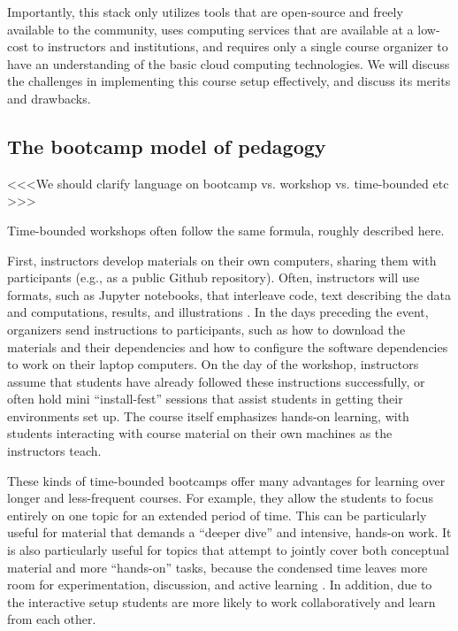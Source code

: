 Importantly, this stack only utilizes tools that are
open-source and freely available to
the community, uses computing services that are available at a low-cost
to instructors and institutions, and requires only a single course organizer
to have an understanding of the basic cloud computing technologies.
We will discuss the challenges in implementing this course setup effectively,
and discuss its merits and drawbacks.

\subsection{The bootcamp model of pedagogy}

<<<We should clarify language on bootcamp vs. workshop vs. time-bounded etc >>>

Time-bounded workshops often follow the same formula, roughly described here.

First, instructors develop materials on their own computers, sharing them with
participants (e.g., as a public Github repository). Often, instructors will use
formats, such as Jupyter notebooks, that interleave code, text describing the
data and computations, results, and illustrations
\cite{kluyver2016jupyter}. In the days preceding the event, organizers send
instructions to participants, such as how to download the materials and their
dependencies and how to configure the software dependencies to work on their
laptop computers. On the day of the workshop, instructors assume that
students have already followed these instructions successfully, or often hold
mini ``install-fest'' sessions that assist students in
getting their environments set up. The course itself emphasizes hands-on
learning, with students interacting with course material on their own
machines as the instructors teach.

These kinds of time-bounded bootcamps offer many advantages for learning over
longer and less-frequent courses. For example, they allow the students to focus
entirely on one topic for an extended period of time. This can be particularly
useful for material that demands a ``deeper dive'' and intensive, hands-on
work. It is also particularly useful for topics that attempt to jointly
cover both conceptual material and more ``hands-on'' tasks, because the
condensed time leaves more room for experimentation, discussion, and active
learning \citep{Bransford2000-lu, Papert1980-fh}. In addition, due to the
interactive setup students are more likely to work collaboratively and learn
from each other.

